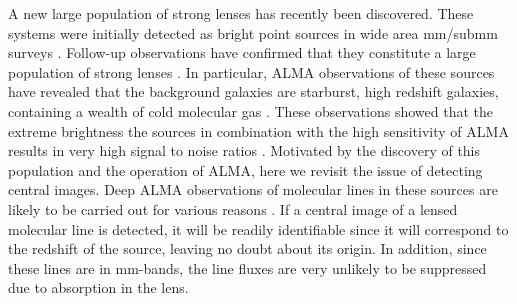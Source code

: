 \documentclass[chicago]{emulateapj}
\begin{document}
A new large population of strong lenses has recently been discovered. These systems were initially detected as bright point sources in wide area mm/submm surveys \citep{vieira:10,negrello:10}. Follow-up observations have confirmed that they constitute a large population of strong lenses \citep{vieira:13, hezaveh:13b, bussmann:13}.
In particular, ALMA observations of these sources have revealed that the background galaxies are starburst, high redshift galaxies, containing a wealth of cold molecular gas \citep{Weiss:13}.  These observations showed that the extreme brightness the sources in combination with the high sensitivity of ALMA results in very high signal to noise ratios \citep[e.g. the lens models in][were based on $\sim50$ second long observations]{hezaveh:13b}.
Motivated by the discovery of this population and the operation of ALMA, here we revisit the issue of detecting central images.
Deep ALMA observations of molecular lines in these sources are likely to be carried out for various reasons \citep[e.g.,][]{hezaveh:14a,hezaveh:14b}. If a central image of a lensed molecular line is detected, it will be readily identifiable since it will correspond to the redshift of the source, leaving no doubt about its origin. In addition, since these lines are in mm-bands, the line fluxes are very unlikely to be suppressed due to absorption in the lens. 

\end{document}
